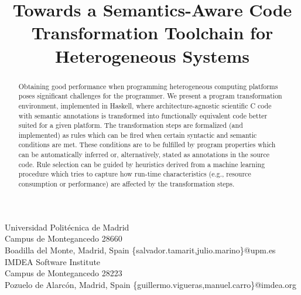 \documentclass[svgnames,usenames,preprint,nocopyrightspace]{sigplanconf}
\begin{document}
\setlength{\pdfpageheight}{\paperheight}
\setlength{\pdfpagewidth}{\paperwidth}



     






\title{Towards a Semantics-Aware Code Transformation Toolchain for
       Heterogeneous Systems} 



           {Universidad Polit\'ecnica de Madrid \\
             Campus de Montegancedo 28660 \\
             Boadilla del Monte, Madrid, Spain}
           {\{salvador.tamarit,julio.marino\}@upm.es}
           {IMDEA Software Institute \\
             Campus de Montegancedo 28223 \\
             Pozuelo de Alarc\'on, Madrid, Spain}
           {\{guillermo.vigueras,manuel.carro\}@imdea.org }

\maketitle

\begin{abstract}
Obtaining good performance when programming heterogeneous computing
platforms poses significant challenges for the programmer.  
We present a program transformation environment, implemented in
Haskell, where architecture-agnostic scientific C code with semantic
annotations is transformed into  functionally equivalent code better
suited for a given platform.  
The transformation steps are formalized (and implemented) as rules
which can be fired when certain syntactic and 
semantic conditions are met.  These conditions are to be fulfilled by
program properties which can 
be automatically inferred or, alternatively, stated as annotations in
the source code.   
Rule selection can be guided by heuristics derived from a machine
learning procedure
which tries to capture how run-time characteristics
(e.g., resource consumption or performance) are affected by the transformation
steps. 
\end{abstract}
\end{document}
